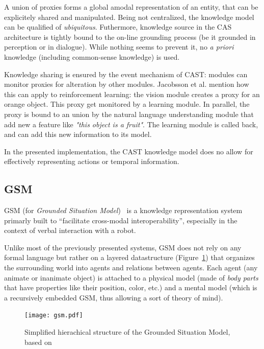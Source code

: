 \documentclass[a4paper, twocolumn]{article}
\begin{document}
A union of proxies forms a global amodal representation of an entity, that can
be explicitely shared and manipulated. Being not centralized, the knowledge
model can be qualified of \emph{ubiquitous}. Futhermore, knowledge source in
the CAS architecture is tightly bound to the on-line grounding process (be it
grounded in perception or in dialogue). While nothing seems to prevent it, no
{\it a priori} knowledge (including common-sense knowledge) is used.

Knowledge sharing is ensured by the event mechanism of CAST: modules can
monitor proxies for alteration by other modules. Jacobsson et al. mention how
this can apply to reinforcement learning: the vision module creates a proxy for
an orange object. This proxy get monitored by a learning module. In parallel,
the proxy is bound to an union by the natural language understanding module
that add new a feature like \emph{"this object is a fruit"}. The learning
module is called back, and can add this new information to its model.

In the presented implementation, the CAST knowledge model does no allow for
effectively representing actions or temporal information.

\subsection{GSM}
\label{sect|gsm}

GSM (for \emph{Grounded Situation Model})~\cite{Mavridis2006} is a knowledge
representation system primarly built to ``facilitate cross-modal
interoperability'',  especially in the context of verbal interaction with a
robot.

Unlike most of the previously presented systems, GSM does not rely on any
formal language but rather on a layered datastructure (Figure~\ref{fig|gsm})
that organizes the surrounding world into agents and relations between agents.
Each agent (any animate or inanimate object) is attached to a physical model (made
of \emph{body parts} that have properties like their position, color, etc.) and
a mental model (which is a recursively embedded GSM, thus allowing a sort of
theory of mind).

\begin{figure}
    \centering
    \texttt{[image: gsm.pdf]}

    \caption{Simplified hierachical structure of the Grounded Situation Model,
    based on~\cite{Mavridis2006}}

    \label{fig|gsm}
\end{figure}
\end{document}
